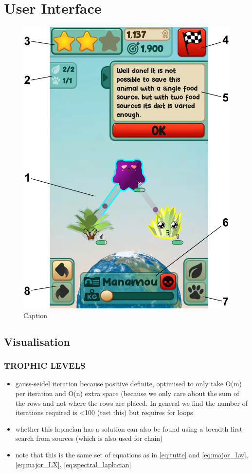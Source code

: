 \section{User Interface}
\label{sec:user_interface}
\begin{figure}
    \centering
    \includegraphics[height=.9\textheight]{joy/gameplay.pdf}
    \caption[A labelled screenshot of EcoBuilder gameplay]{Caption}
    \label{fig:eco_UI}
\end{figure}

\subsection{Visualisation}
\label{sec:eco_visualisation}
\subsubsection{TROPHIC LEVELS}
\begin{itemize}
  \item gauss-seidel iteration because positive definite, optimised to only take O(m) per iteration and O(n) extra space (because we only care about the sum of the rows and not where the rows are placed. In general we find the number of iterations required is <100 (test this) but requires for loops
  \item whether this laplacian has a solution can also be found using a breadth first search from sources (which is also used for chain)
  \item note that this is the same set of equations as in \eqref{eq:tutte} and \eqref{eq:major_Lw}, \eqref{eq:major_LX}, \eqref{eq:spectral_laplacian}
\end{itemize}
